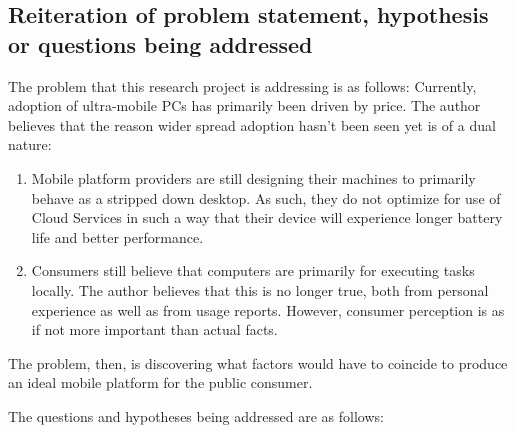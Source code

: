 \documentclass[12pt,oneside,letterpaper,titlepage]{article}
\begin{document}
\subsection{Reiteration of problem statement, hypothesis or questions being addressed}

The problem that this research project is addressing is as follows: Currently,
adoption of ultra-mobile PCs has primarily been driven by price.  The author
believes that the reason wider spread adoption hasn't been seen yet is of a dual
nature:

\begin{enumerate}

\item Mobile platform providers are still designing their machines to primarily
  behave as a stripped down desktop.  As such, they do not optimize for use of
  Cloud Services in such a way that their device will experience longer battery
  life and better performance.

\item Consumers still believe that computers are primarily for executing tasks
  locally.  The author believes that this is no longer true, both from personal
  experience as well as from usage reports.  However, consumer perception is as
  if not more important than actual facts.

\end{enumerate}

The problem, then, is discovering what factors would have to coincide to produce
an ideal mobile platform for the public consumer.

The questions and hypotheses being addressed are as follows:
\end{document}
